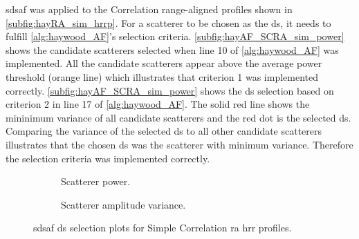 \documentclass[class=report,11pt,crop=false]{standalone}
\begin{document}
    \gls{sdsaf} was applied to the Correlation range-aligned profiles shown in \autoref{subfig:hayRA_sim_hrrp}. For a scatterer to be chosen as the \gls{ds}, it needs to fulfill \autoref{alg:haywood_AF}'s selection criteria. \autoref{subfig:hayAF_SCRA_sim_power} shows the candidate scatterers selected when line 10 of \autoref{alg:haywood_AF} was implemented. All the candidate scatterers appear above the average power threshold (orange line) which illustrates that criterion 1 was implemented correctly. \autoref{subfig:hayAF_SCRA_sim_power} shows the \gls{ds} selection based on criterion 2 in line 17 of \autoref{alg:haywood_AF}. The solid red line shows the mininimum variance of all candidate scatterers and the red dot is the selected \gls{ds}. Comparing the variance of the selected \gls{ds} to all other candidate scatterers illustrates that the chosen \gls{ds} was the scatterer with minimum variance. Therefore the selection criteria was implemented correctly.

    \begin{figure}
        \centering
        \begin{subfigure}{0.45\linewidth}
            \resizebox{\linewidth}{!}{}
            \caption{Scatterer power.} \label{subfig:hayAF_SCRA_sim_power}
        \end{subfigure}
        \hspace{1cm}
        \begin{subfigure}{0.45\linewidth}
            \resizebox{\linewidth}{!}{}
            \caption{Scatterer amplitude variance.} \label{subfig:hayAF_SCRA_sim_var}
        \end{subfigure}
        \caption{\gls{sdsaf} \gls{ds} selection plots for Simple Correlation \gls{ra} \gls{hrr} profiles.\label{subfig:hayAF_SCRA_sim_power&var}}
    \end{figure}
\end{document}
